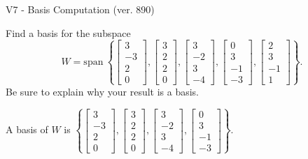 \begin{exercise}
  \begin{exerciseTitle}V7 - Basis Computation (ver. 890)\end{exerciseTitle}
  \begin{exerciseStatement}
    Find a basis for the subspace 
\[W=\mathrm{span}\ \left\{\left[\begin{array}{r}
3 \\
-3 \\
2 \\
0
\end{array}\right] , \left[\begin{array}{r}
3 \\
2 \\
2 \\
0
\end{array}\right] , \left[\begin{array}{r}
3 \\
-2 \\
3 \\
-4
\end{array}\right] , \left[\begin{array}{r}
0 \\
3 \\
-1 \\
-3
\end{array}\right] , \left[\begin{array}{r}
2 \\
3 \\
-1 \\
1
\end{array}\right]\right\}.\]
 Be sure to explain why your result is a basis.


  \end{exerciseStatement}
  \begin{exerciseAnswer}
   A basis of \(W\) is  \(\left\{\left[\begin{array}{r}
3 \\
-3 \\
2 \\
0
\end{array}\right] , \left[\begin{array}{r}
3 \\
2 \\
2 \\
0
\end{array}\right] , \left[\begin{array}{r}
3 \\
-2 \\
3 \\
-4
\end{array}\right] , \left[\begin{array}{r}
0 \\
3 \\
-1 \\
-3
\end{array}\right]\right\}\).
  


  \end{exerciseAnswer}
\end{exercise}